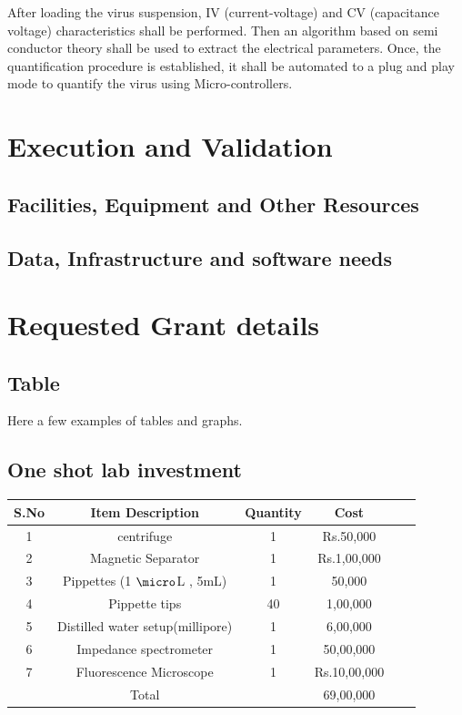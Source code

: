 \documentclass{FR16}
\begin{document}
After loading the virus suspension, IV (current-voltage) and CV (capacitance voltage) characteristics shall be performed. Then an algorithm based on semi conductor theory shall be used to extract the electrical parameters. Once, the quantification procedure is established, it shall be automated to a plug and play mode to quantify the virus using Micro-controllers.





\newpage
\section{Execution and Validation}





\subsection{Facilities, Equipment and Other Resources}





\subsection{Data, Infrastructure and software needs}



\section{Requested Grant details}

\subsection{Table }
Here a few examples of tables and graphs.
\subsection{One shot lab investment}
\begin{center}
\begin{tabular}{c c c c c c}
\arrayrulecolor{Azzurro}
\hline
{\bfseries S.No} & {\bfseries Item Description}& {\bfseries Quantity} & {\bfseries Cost} \\
\hline
1 & centrifuge & 1 & Rs.50,000\\
\hline
2 & Magnetic Separator & 1 & Rs.1,00,000   \\
\hline
3 &Pippettes (1 $\micro$L , 5mL) & 1 & 50,000\\ 
\hline 
4 &Pippette tips & 40 & 1,00,000\\ 
\hline
5 &Distilled water setup(millipore) & 1  & 6,00,000\\
\hline
6 &Impedance spectrometer & 1 & 50,00,000\\
\hline
7 &Fluorescence Microscope &  1 & Rs.10,00,000\\
\hline
 & Total & & 69,00,000
 \end{tabular}
\end{center}
\end{document}
